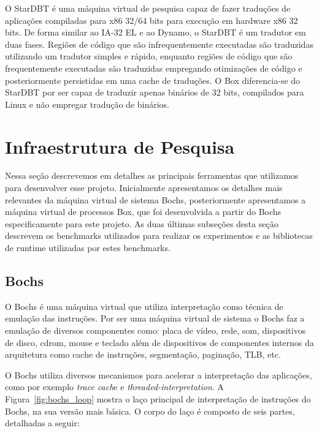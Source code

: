 \documentclass[11pt,twoside]{article}
\begin{document}
O StarDBT \cite{Wang2007} é uma máquina virtual de pesquisa capaz de fazer
traduções de aplicações compiladas para x86 32/64 bits para execução em hardware
x86 32 bits. De forma similar ao IA-32 EL e ao Dynamo, o StarDBT é um tradutor
em duas fases. Regiões de código que são infrequentemente executadas são
traduzidas utilizando um tradutor simples e rápido, enquanto regiões de código
que são frequentemente executadas são traduzidas empregando otimizações de
código e posteriormente persistidas em uma cache de traduções. O Box
diferencia-se do StarDBT por ser capaz de traduzir apenas binários de 32 bits,
compilados para Linux e não empregar tradução de binários.



\section{Infraestrutura de Pesquisa} \label{sec:infraestrutura}

Nessa seção descrevemos em detalhes as principais ferramentas que utilizamos
para desenvolver esse projeto. Inicialmente apresentamos os detalhes mais
relevantes da máquina virtual de sistema Bochs, posteriormente apresentamos a
máquina virtual de processos Box, que foi desenvolvida a partir do Bochs
especificamente para este projeto.  As duas últimas subseções desta seção
descrevem os benchmarks utilizados para realizar os experimentos e as
bibliotecas de runtime utilizadas por estes benchmarks.

\subsection{Bochs}

O Bochs é uma máquina virtual que utiliza interpretação como técnica de emulação
das instruções. Por ser uma máquina virtual de sistema o Bochs faz a emulação de
diversos componentes como: placa de vídeo, rede, som, dispositivos de disco,
cdrom, mouse e teclado além de dispositivos de componentes internos da
arquitetura como cache de instruções, segmentação, paginação, TLB, etc.

O Bochs utiliza diversos mecanismos para acelerar a interpretação das
aplicações, como por exemplo \emph{trace cach}e e \emph{threaded-interpretation}. A
Figura~\ref{fig:bochs_loop} mostra o laço principal de interpretação de
instruções do Bochs, na sua versão mais básica. O corpo do laço é composto de
seis partes, detalhadas a seguir:
\end{document}
